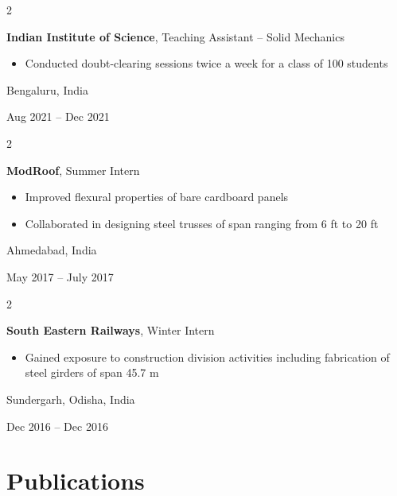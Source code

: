 \documentclass[10pt, letterpaper]{article}
\newenvironment{highlights}{
    \begin{itemize}[
        topsep=0.10 cm,
        parsep=0.10 cm,
        partopsep=0pt,
        itemsep=0pt,
        leftmargin=0.4 cm + 10pt
    ]
}{
    \end{itemize}
} %
\newenvironment{twocolentry}[2][]{
    \onecolentry
    \def\secondColumn{#2}
    \setcolumnwidth{\fill, 4.5 cm}
    \begin{paracol}{2}
}{
    \switchcolumn \raggedleft \secondColumn
    \end{paracol}
    \endonecolentry
} %
\begin{document}
        \vspace{0.2 cm}

        \begin{twocolentry}{
            Bengaluru, India

        Aug 2021 – Dec 2021
        }
            \textbf{Indian Institute of Science}, Teaching Assistant – Solid Mechanics
            \begin{highlights}
                \item Conducted doubt-clearing sessions twice a week for a class of 100 students
            \end{highlights}
        \end{twocolentry}


        \vspace{0.2 cm}

        \begin{twocolentry}{
            Ahmedabad, India

        May 2017 – July 2017
        }
            \textbf{ModRoof}, Summer Intern
            \begin{highlights}
                \item Improved flexural properties of bare cardboard panels
                \item Collaborated in designing steel trusses of span ranging from 6 ft to 20 ft
            \end{highlights}
        \end{twocolentry}


        \vspace{0.2 cm}

        \begin{twocolentry}{
            Sundergarh, Odisha, India

        Dec 2016 – Dec 2016
        }
            \textbf{South Eastern Railways}, Winter Intern
            \begin{highlights}
                \item Gained exposure to construction division activities including fabrication of steel girders of span 45.7 m
            \end{highlights}
        \end{twocolentry}



    
    \section{Publications}
\end{document}
